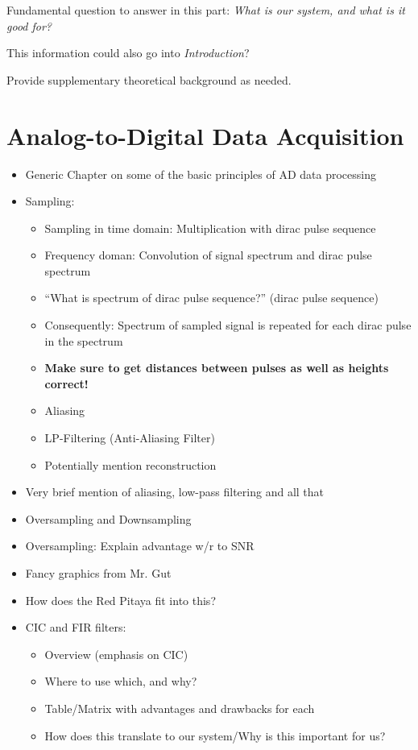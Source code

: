 \documentclass[a4paper,oneside]{alpenthesis/alpenthesis}
\begin{document}
Fundamental question  to answer in  this part:  \emph{What is our  system, and
what is it good for?}

This information could also go into \emph{Introduction}?

Provide supplementary theoretical background as needed.


\chapter{Analog-to-Digital Data Acquisition} %
\label{ch:analog-to-digital_data_aquisition}

\begin{itemize}
    \item
    Generic Chapter on some of the basic principles of AD data processing
    \item
    Sampling:
        \begin{itemize}
            \item
            Sampling in time domain: Multiplication with dirac pulse sequence
            \item
            Frequency doman: Convolution of signal spectrum and dirac pulse spectrum
            \item
            ``What is spectrum of dirac pulse sequence?'' (dirac pulse sequence)
            \item
            Consequently: Spectrum of sampled signal is repeated for each dirac pulse in the spectrum
            \item
            \textbf{Make sure to get distances between pulses as well as heights correct!}
            \item
            Aliasing
            \item
            LP-Filtering (Anti-Aliasing Filter)
            \item
            Potentially mention reconstruction
        \end{itemize}
    \item 
    Very brief mention of aliasing, low-pass filtering and all that
    \item
    Oversampling and Downsampling
    \item
    Oversampling: Explain advantage w/r to SNR
    \item
    Fancy graphics from Mr. Gut
    \item
    How does the Red Pitaya fit into this?
    \item
    CIC and FIR filters:
        \begin{itemize}
            \item
            Overview (emphasis on CIC)
            \item
            Where to use which, and why?
            \item
            Table/Matrix with advantages and drawbacks for each
            \item
            How does this translate to our system/Why is this important for us?
        \end{itemize}
\end{itemize}
\end{document}
